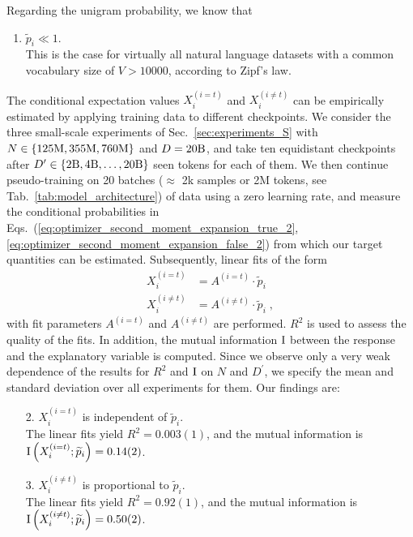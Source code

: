 Regarding the unigram probability, we know that
\begin{enumerate}
\item $\widetilde p_i \ll 1$. \\
This is the case for virtually all natural language datasets with a common vocabulary size of $V > 10000$, according to Zipf's law.
\end{enumerate}
The conditional expectation values $X_i^{(i=t)}$ and $X_i^{(i\neq t)}$ can be empirically estimated by applying training data to different checkpoints. We consider the three small-scale experiments of Sec.~\ref{sec:experiments_S} with $N \in \{ 125\rm M, 355\rm M, 760\rm M \}$ and $D=20\rm B$, and take ten equidistant checkpoints after $D^\prime \in \{ 2\rm B, 4\rm B, \ldots, 20\rm B\}$ seen tokens for each of them. We then continue pseudo-training on 20 batches ($\approx$ 2k samples or 2M tokens, see Tab.~\ref{tab:model_architecture}) of data using a zero learning rate, and measure the conditional probabilities in Eqs.~(\ref{eq:optimizer_second_moment_expansion_true_2}, \ref{eq:optimizer_second_moment_expansion_false_2}) from which our target quantities can be estimated.  
Subsequently, linear fits of the form 
\begin{align}
    X_i^{(i = t)} &= A^{(i = t)} \cdot \widetilde p_i \\
    X_i^{(i \neq t)} &= A^{(i \neq t)} \cdot \widetilde p_i \; ,
\end{align}
with fit parameters $A^{(i = t)}$ and $A^{(i \neq t)}$ are performed. $R^2$ is used to assess the quality of the fits. In addition, the mutual information ${\rm I}$ between the response and the explanatory variable is computed. 
Since we observe only a very weak dependence of the results for $R^2$ and ${\rm I}$ on $N$ and $D^\prime$, we specify the mean and standard deviation over all experiments for them.
Our findings are:
\begin{enumerate}
\item[2.] $X_i^{(i = t)}$ is independent of $\widetilde p_i$. \\
The linear fits yield $R^2 = 0.003(1)$, and the mutual information is ${\rm I} \left(X_i^{(i = t)}; \widetilde p_i \right) = 0.14(2)$.
\item[3.] $X_i^{(i \neq t)}$ is proportional to $\widetilde p_i$. \\
The linear fits yield $R^2 = 0.92(1)$, and the mutual information is ${\rm I} \left( X_i^{(i \neq t)}; \widetilde p_i \right) = 0.50(2)$.
\end{enumerate}

